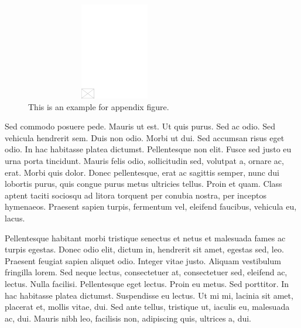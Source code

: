 \documentclass[AMA,Times1COL]{WileyNJDv5} %
\begin{document}
\begin{figure}[b]
\centerline{\includegraphics[height=10pc,width=78mm,draft]{empty}}
\caption{This is an example for appendix figure.\label{fig5}}
\end{figure}


Sed commodo posuere pede. Mauris ut est. Ut quis purus. Sed ac odio. Sed vehicula hendrerit sem. Duis non odio.
Morbi ut dui. Sed accumsan risus eget odio. In hac habitasse platea dictumst. Pellentesque non elit. Fusce sed justo
eu urna porta tincidunt. Mauris felis odio, sollicitudin sed, volutpat a, ornare ac, erat. Morbi quis dolor. Donec
pellentesque, erat ac sagittis semper, nunc dui lobortis purus, quis congue purus metus ultricies tellus. Proin et quam.
Class aptent taciti sociosqu ad litora torquent per conubia nostra, per inceptos hymenaeos. Praesent sapien turpis,
fermentum vel, eleifend faucibus, vehicula eu, lacus.

Pellentesque habitant morbi tristique senectus et netus et malesuada fames ac turpis egestas. Donec odio elit,
dictum in, hendrerit sit amet, egestas sed, leo. Praesent feugiat sapien aliquet odio. Integer vitae justo. Aliquam
vestibulum fringilla lorem. Sed neque lectus, consectetuer at, consectetuer sed, eleifend ac, lectus. Nulla facilisi.
Pellentesque eget lectus. Proin eu metus. Sed porttitor. In hac habitasse platea dictumst. Suspendisse eu lectus. Ut
mi mi, lacinia sit amet, placerat et, mollis vitae, dui. Sed ante tellus, tristique ut, iaculis eu, malesuada ac, dui.
Mauris nibh leo, facilisis non, adipiscing quis, ultrices a, dui.
\end{document}
